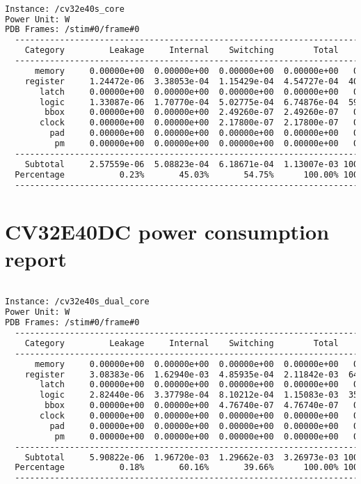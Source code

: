 \begin{lstlisting}[caption={Power consumption report from synthesis of the CV32E40S.}, label=lst:cv32e40s_power, language=txt]

Instance: /cv32e40s_core
Power Unit: W
PDB Frames: /stim#0/frame#0
  -------------------------------------------------------------------------
    Category         Leakage     Internal    Switching        Total    Row%
  -------------------------------------------------------------------------
      memory     0.00000e+00  0.00000e+00  0.00000e+00  0.00000e+00   0.00%
    register     1.24472e-06  3.38053e-04  1.15429e-04  4.54727e-04  40.24%
       latch     0.00000e+00  0.00000e+00  0.00000e+00  0.00000e+00   0.00%
       logic     1.33087e-06  1.70770e-04  5.02775e-04  6.74876e-04  59.72%
        bbox     0.00000e+00  0.00000e+00  2.49260e-07  2.49260e-07   0.02%
       clock     0.00000e+00  0.00000e+00  2.17800e-07  2.17800e-07   0.02%
         pad     0.00000e+00  0.00000e+00  0.00000e+00  0.00000e+00   0.00%
          pm     0.00000e+00  0.00000e+00  0.00000e+00  0.00000e+00   0.00%
  -------------------------------------------------------------------------
    Subtotal     2.57559e-06  5.08823e-04  6.18671e-04  1.13007e-03 100.00%
  Percentage           0.23%       45.03%       54.75%      100.00% 100.00%
  -------------------------------------------------------------------------
\end{lstlisting}

\section{CV32E40DC power consumption report}
\label{app:dc_pow}

\begin{lstlisting}[caption={Power consumption report from synthesis of the CV32E40SDC.}, label=lst:cv32e40dc_power, language=txt]

Instance: /cv32e40s_dual_core
Power Unit: W
PDB Frames: /stim#0/frame#0
  -------------------------------------------------------------------------
    Category         Leakage     Internal    Switching        Total    Row%
  -------------------------------------------------------------------------
      memory     0.00000e+00  0.00000e+00  0.00000e+00  0.00000e+00   0.00%
    register     3.08383e-06  1.62940e-03  4.85935e-04  2.11842e-03  64.79%
       latch     0.00000e+00  0.00000e+00  0.00000e+00  0.00000e+00   0.00%
       logic     2.82440e-06  3.37798e-04  8.10212e-04  1.15083e-03  35.20%
        bbox     0.00000e+00  0.00000e+00  4.76740e-07  4.76740e-07   0.01%
       clock     0.00000e+00  0.00000e+00  0.00000e+00  0.00000e+00   0.00%
         pad     0.00000e+00  0.00000e+00  0.00000e+00  0.00000e+00   0.00%
          pm     0.00000e+00  0.00000e+00  0.00000e+00  0.00000e+00   0.00%
  -------------------------------------------------------------------------
    Subtotal     5.90822e-06  1.96720e-03  1.29662e-03  3.26973e-03 100.00%
  Percentage           0.18%       60.16%       39.66%      100.00% 100.00%
  -------------------------------------------------------------------------
\end{lstlisting}

